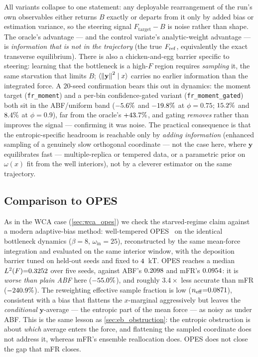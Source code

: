 All variants collapse to one statement: any deployable rearrangement of the run's
own observables either returns $B$ exactly or departs from it only by added bias
or estimation variance, so the steering signal $F_{\mathrm{target}}-B$ is noise
rather than shape. The oracle's advantage --- and the control variate's
analytic-weight advantage --- is \emph{information that is not in the trajectory}
(the true $F_{\mathrm{ref}}$, equivalently the exact transverse equilibrium). There is also
a chicken-and-egg barrier specific to steering: learning that the bottleneck is a
high-$F$ region requires \emph{sampling} it, the same starvation that limits $B$;
$\langle\left\lVert \mathbf y \right\rVert^2\mid x\rangle$ carries no earlier information than the
integrated force. A $20$-seed confirmation bears this out in dynamics: the moment
target (\texttt{fr\_moment}) and a per-bin confidence-gated variant
(\texttt{fr\_moment\_gated}) both sit in the ABF/uniform band
($-5.6\%$ and $-19.8\%$ at $\phi=0.75$;
$15.2\%$ and $8.4\%$ at $\phi=0.9$), far from the
oracle's $+43.7\%$, and gating \emph{removes} rather than improves the
signal --- confirming it was noise. The practical consequence is that the
entropic-specific headroom is reachable only by \emph{adding information}
(enhanced sampling of a genuinely slow orthogonal coordinate --- not the case
here, where $\mathbf y$ equilibrates fast --- multiple-replica or tempered data, or
a parametric prior on $\omega(x)$ fit from the well interiors), not by a cleverer
estimator on the same trajectory.

\subsection{Comparison to OPES}
\label{sec:eb_opes}
As in the WCA case (\cref{sec:wca_opes}) we check the starved-regime claim against a
modern adaptive-bias method: well-tempered OPES~\citep{invernizzi2020rethinking} on
the identical bottleneck dynamics ($\beta{=}8$, $\omega_{\mathrm{in}}{=}25$),
reconstructed by the same mean-force integration and evaluated on the same interior
window, with the deposition barrier tuned on held-out seeds and fixed to
$4$~kT. OPES reaches a median $L^2(F){=}0.3252$ over five seeds,
against ABF's $0.2098$ and mFR's $0.0954$: it is
\emph{worse than plain ABF} here ($-55.0\%$), and roughly
$3.4\times$ less accurate than mFR ($-240.9\%$). The reweighting effective
sample fraction is low ($n_{\mathrm{eff}}{=}0.0871$), consistent with a bias
that flattens the $x$-marginal aggressively but leaves the \emph{conditional}
$\mathbf y$-average --- the entropic part of the mean force --- as noisy as under
ABF. This is the same lesson as \cref{sec:eb_obstruction}: the entropic obstruction is
about \emph{which} average enters the force, and flattening the sampled coordinate
does not address it, whereas mFR's ensemble reallocation does. OPES does not close
the gap that mFR closes.

